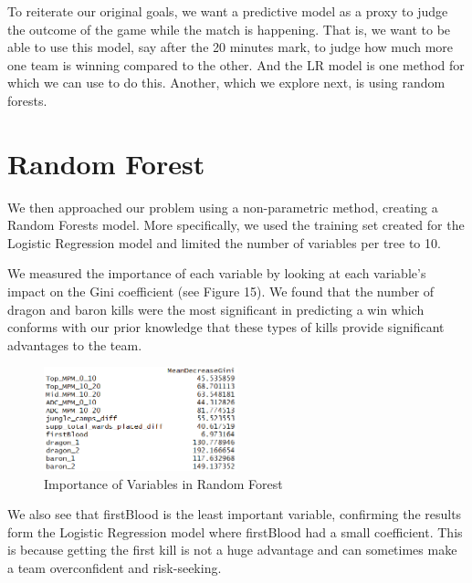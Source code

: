 \documentclass[runningheads]{llncs}
\begin{document}
	To reiterate our original goals, we want a predictive model as a proxy to judge the outcome of the game while the match is happening. That is, we want to be able to use this model, say after the 20 minutes mark, to judge how much more one team is winning compared to the other. And the LR model is one method for which we can use to do this. Another, which we explore next, is using random forests.
	
	\section{Random Forest}
	
	We then approached our problem using a non-parametric method, creating a Random Forests 
model. More specifically, we used the training set created for the Logistic Regression model and limited the number of variables per tree to 10. 

	We measured the importance of each variable by looking at each variable’s impact on the Gini coefficient (see Figure 15). We found that the number of dragon and baron kills were the most significant in predicting a win which conforms with our prior knowledge that these types of kills provide significant advantages to the team.
	
	\begin{figure}[!htb]
		\centering
		\includegraphics[width=0.5\textwidth]{images/rf_importance.png}
		\caption{Importance of Variables in Random Forest}
	\end{figure}
	
	We also see that firstBlood is the least important variable, confirming the results form the Logistic Regression model where firstBlood had a small coefficient. This is because getting the first kill is not a huge advantage and can sometimes make a team overconfident and risk-seeking.
	
\end{document}

